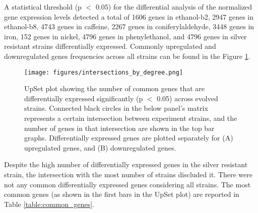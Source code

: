 A statistical threshold (p $<$ 0.05) for the differential analysis of the normalized gene expression levels detected a total of 1606 genes in ethanol-b2, 2947 genes in ethanol-b8, 4743 genes in caffeine, 2267 genes in coniferylaldehyde, 3448 genes in iron, 152 genes in nickel, 4796 genes in phenylethanol, and 4796 genes in silver resistant strains differentially expressed. Commonly upregulated and downregulated genes frequencies across all strains can be found in the Figure \ref{fig:intersections_by_degree}.



\begin{figure}[H]
  \begin{center}
  \texttt{[image: figures/intersections\_by\_degree.png]}
  \caption[UpSet plot showing the number of common genes that are differentially expressed significantly]{UpSet plot showing the number of common genes that are differentially expressed significantly (p $<$ 0.05) across evolved strains. Connected black circles in the below panel's matrix represents a certain intersection between experiment strains, and the number of genes in that intersection are shown in the top bar graphs. Differentially expressed genes are plotted separately for (A) upregulated genes, and (B) downregulated genes.}
  \label{fig:intersections_by_degree}
  \end{center}
\end{figure}

Despite the high number of differentially expressed genes in the silver resistant strain, the intersection with the most number of strains discluded it. There were not any common differentially expressed genes considering all strains. The most common genes (as shown in the first bars in the UpSet plot) are reported in Table \ref{table:common_genes}.

